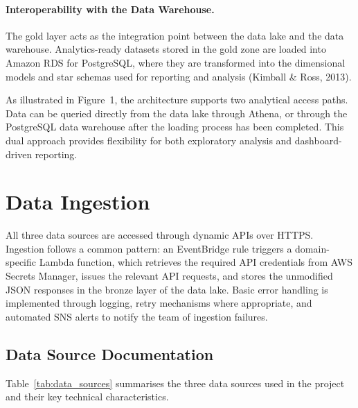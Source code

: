 \documentclass[11pt,a4paper]{article}
\begin{document}
\paragraph{Interoperability with the Data Warehouse.}
The gold layer acts as the integration point between the data lake and
the data warehouse. Analytics-ready datasets stored in the gold zone
are loaded into Amazon RDS for PostgreSQL, where they are transformed
into the dimensional models and star schemas used for reporting and
analysis (Kimball \& Ross, 2013).

As illustrated in Figure~1, the architecture supports two analytical
access paths. Data can be queried directly from the data lake through
Athena, or through the PostgreSQL data warehouse after the loading
process has been completed. This dual approach provides flexibility for
both exploratory analysis and dashboard-driven reporting.

\newpage

\section{Data Ingestion}
\label{sec:data_ingestion}

All three data sources are accessed through dynamic APIs over HTTPS.
Ingestion follows a common pattern: an EventBridge rule triggers a
domain-specific Lambda function, which retrieves the required API
credentials from AWS Secrets Manager, issues the relevant API requests,
and stores the unmodified JSON responses in the bronze layer of the
data lake. Basic error handling is implemented through logging, retry
mechanisms where appropriate, and automated SNS alerts to notify the
team of ingestion failures.

\subsection{Data Source Documentation}
\label{sec:data_source_doc}

Table~\ref{tab:data_sources} summarises the three data sources used in
the project and their key technical characteristics.
\end{document}
